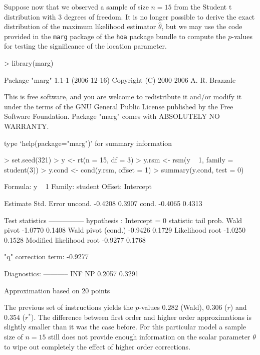 \documentclass[a4paper,11pt]{article}
\def\code{\texttt}
\begin{document}
Suppose now that we observed a sample of size $n = 15$ from the Student t distribution with $3$ degrees of freedom.  It is no longer possible to derive the exact distribution of the maximum likelihood estimator $\hat\theta$, but we may use the code provided in the \code{marg} package of the \code{hoa} package bundle to compute the $p$-values for testing the significance of the location parameter.  

\begin{Schunk}
\begin{Sinput}
> library(marg)
\end{Sinput}
\begin{Soutput}
   Package "marg" 1.1-1 (2006-12-16) 
   Copyright (C) 2000-2006 A. R. Brazzale

This is free software, and you are welcome to redistribute
it and/or modify it under the terms of the GNU General
Public License published by the Free Software Foundation.
Package "marg" comes with ABSOLUTELY NO WARRANTY.

type `help(package="marg")' for summary information
\end{Soutput}
\begin{Sinput}
> set.seed(321)
> y <- rt(n = 15, df = 3)
> y.rsm <- rsm(y ~ 1, family = student(3))
> y.cond <- cond(y.rsm, offset = 1)
> summary(y.cond, test = 0)
\end{Sinput}
\begin{Soutput}
 Formula:  y ~ 1
 Family:  student
 Offset:  Intercept

          Estimate   Std. Error 
uncond.     -0.4208       0.3907
cond.       -0.4065       0.4313

Test statistics
---------------
 hypothesis : Intercept = 0 
                           statistic  tail prob.
Wald pivot                   -1.0770      0.1408
Wald pivot (cond.)           -0.9426      0.1729
Likelihood root              -1.0250      0.1528
Modified likelihood root     -0.9277      0.1768
                            
"q" correction term: -0.9277

Diagnostics:
----------- 
   INF     NP 
0.2057 0.3291 

 Approximation based on 20 points
\end{Soutput}
\end{Schunk}

The previous set of instructions yields the $p$-values $0.282$ (Wald), $0.306$ ($r$) and $0.354$ ($r^*$).  The difference between first order and higher order approximations is slightly smaller than it was the case before.  For this particular model a sample size of $n=15$ still does not provide enough information on the scalar parameter $\theta$ to wipe out completely the effect of higher order corrections. 
\end{document}
